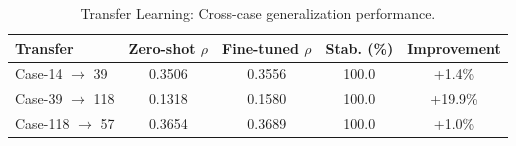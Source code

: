 \begin{table}[t]
\centering
\caption{Transfer Learning: Cross-case generalization performance.}
\label{tab:transfer}
\begin{tabular}{lcccc}
\toprule
Transfer & Zero-shot $\rho$ & Fine-tuned $\rho$ & Stab. (\%) & Improvement \\
\midrule
Case-14 $\to$ 39 & 0.3506 & 0.3556 & 100.0 & +1.4\% \\
Case-39 $\to$ 118 & 0.1318 & 0.1580 & 100.0 & +19.9\% \\
Case-118 $\to$ 57 & 0.3654 & 0.3689 & 100.0 & +1.0\% \\
\bottomrule
\end{tabular}
\end{table}